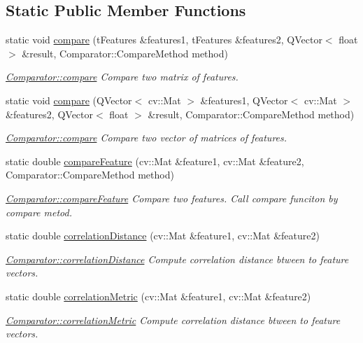\subsection*{Static Public Member Functions}
\begin{DoxyCompactItemize}
\item 
static void \hyperlink{class_comparator_a04476f39d9d50c79bbe1dcedd20ba7bf}{compare} (t\+Features \&features1, t\+Features \&features2, Q\+Vector$<$ float $>$ \&result, Comparator\+::\+Compare\+Method method)
\begin{DoxyCompactList}\small\item\em \hyperlink{class_comparator_a04476f39d9d50c79bbe1dcedd20ba7bf}{Comparator\+::compare} Compare two matrix of features. \end{DoxyCompactList}\item 
static void \hyperlink{class_comparator_ab1e88afbea79dfba4fedb5d3c37b3f7a}{compare} (Q\+Vector$<$ cv\+::\+Mat $>$ \&features1, Q\+Vector$<$ cv\+::\+Mat $>$ \&features2, Q\+Vector$<$ float $>$ \&result, Comparator\+::\+Compare\+Method method)
\begin{DoxyCompactList}\small\item\em \hyperlink{class_comparator_a04476f39d9d50c79bbe1dcedd20ba7bf}{Comparator\+::compare} Compare two vector of matrices of features. \end{DoxyCompactList}\item 
static double \hyperlink{class_comparator_a4e839516afb3b8190089bb4987e68aff}{compare\+Feature} (cv\+::\+Mat \&feature1, cv\+::\+Mat \&feature2, Comparator\+::\+Compare\+Method method)
\begin{DoxyCompactList}\small\item\em \hyperlink{class_comparator_a4e839516afb3b8190089bb4987e68aff}{Comparator\+::compare\+Feature} Compare two features. Call compare funciton by compare metod. \end{DoxyCompactList}\item 
static double \hyperlink{class_comparator_a29fccf795aec4767d5c7c8189538141d}{correlation\+Distance} (cv\+::\+Mat \&feature1, cv\+::\+Mat \&feature2)
\begin{DoxyCompactList}\small\item\em \hyperlink{class_comparator_a29fccf795aec4767d5c7c8189538141d}{Comparator\+::correlation\+Distance} Compute correlation distance btween to feature vectors. \end{DoxyCompactList}\item 
static double \hyperlink{class_comparator_ad57d5bebc010ff5b38a566d27ff2ce4f}{correlation\+Metric} (cv\+::\+Mat \&feature1, cv\+::\+Mat \&feature2)
\begin{DoxyCompactList}\small\item\em \hyperlink{class_comparator_ad57d5bebc010ff5b38a566d27ff2ce4f}{Comparator\+::correlation\+Metric} Compute correlation distance btween to feature vectors. \end{DoxyCompactList}\end{DoxyCompactItemize}



